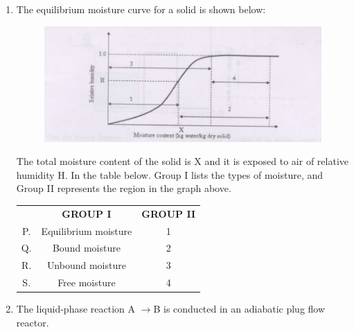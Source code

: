 \documentclass[journal,12pt,onecolumn]{IEEEtran}
\theoremstyle{remark}
\begin{document}
\begin{enumerate}
		\hfill {}
		
		\item The equilibrium moisture curve for a solid is shown below:
		
		\begin{figure}[H]
			\centering
			\includegraphics[width = 0.7\columnwidth]{q38.png}
			\caption{}
			\label{fig:Q38}
		\end{figure}
		
		
		The total moisture content of the solid is X and it is exposed to air of relative humidity H. In the table below. Group I lists the types of moisture, and Group II represents the region in the graph above. 
		\begin{center}
			\begin{tabular}{ c c c }
				& \textbf{GROUP I} &\textbf{GROUP II} \\
				P. & Equilibrium moisture & 1 \\
				Q. & Bound moisture & 2 \\ 
				R. & Unbound moisture & 3 \\
				S. & Free moisture & 4 
			\end{tabular}
		\end{center}
		\begin{enumerate}
		\end{enumerate} 
		
		\hfill {}
		
		
		\item The liquid-phase reaction A $\rightarrow$B is conducted in an adiabatic plug flow reactor.
		

\end{enumerate}
\end{document}
